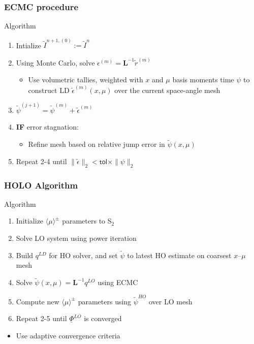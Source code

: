 \documentclass[xcolor=dvipsnames,handout,hyperref={pdfpagelabels=false}]{beamer}
\newlength{\wideitemsep}
\let\olditem\item
\renewcommand{\item}{\setlength{\itemsep}{\wideitemsep}\olditem}
\newcommand{\B}[1]{\ensuremath{\mathbf{#1}}}
\newcommand{\mom}[1]{\langle #1 \rangle}
\begin{document}
\begin{frame}
    \frametitle{ECMC procedure}
    {
    \begin{block}{Algorithm}
    \begin{enumerate}
        \item Intialize $\tilde I^{n+1,(0)}:=\tilde I^{n}$
        \item Using Monte Carlo, solve $\epsilon^{(m)} = \B L^{-1} \tilde r^{(m)}$
            \begin{itemize}
                \item Use volumetric tallies, weighted with $x$ and $\mu$ basis moments time $\psi$ to construct LD
                    $\tilde\epsilon^{(m)}(x,\mu)$ over the current space-angle mesh
            \end{itemize}
        \item $\tilde \psi^{(j+1)} = \tilde \psi^{(m)} + \tilde \epsilon^{(m)}$
        \item \textbf{IF} error stagnation:
            \begin{itemize}
                \item Refine mesh based on relative jump error in $\tilde \psi(x,\mu)$
            \end{itemize}
        \item Repeat 2-4 until $\| \tilde \epsilon \|_2 < \textsf{tol}\times
            \|\psi\|_2$
    \end{enumerate}
    \end{block}
}
\end{frame}

\begin{frame}
    \frametitle{HOLO Algorithm}
    {
    \begin{block}{Algorithm}
        \begin{enumerate}
            \item Initialize $\mom{\mu}^{\pm}$ parameters to S$_2$
            \item Solve LO system using power iteration
            \item Build $q^{LD}$ for HO solver, and set $\tilde{\psi}$ to latest
                HO estimate
                on coarsest $x$--$\mu$ mesh
            \item Solve $\tilde \psi(x,\mu) = \B L^{-1}q^{LO}$ using ECMC
            \item Compute new $\mom{\mu}^\pm$ parameters using $\tilde \psi^{HO}$ over LO mesh
            \item Repeat 2-5 until $\underline \Phi^{LO}$ is converged
        \end{enumerate}

    \begin{itemize}
        \item Use adaptive convergence criteria
    \end{itemize}
    \end{block}
}
\end{frame}
\end{document}
